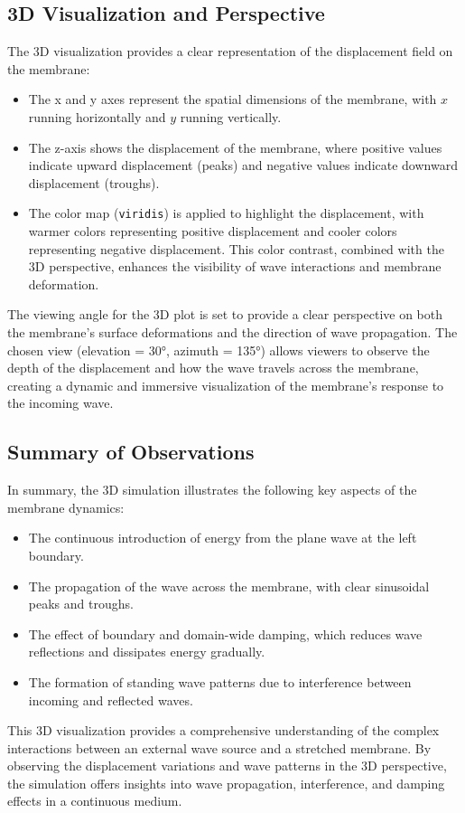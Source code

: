 \documentclass{article}
\begin{document}
\subsection{3D Visualization and Perspective}
The 3D visualization provides a clear representation of the displacement field on the membrane:
\begin{itemize}
    \item The x and y axes represent the spatial dimensions of the membrane, with $x$ running horizontally and $y$ running vertically.
    \item The z-axis shows the displacement of the membrane, where positive values indicate upward displacement (peaks) and negative values indicate downward displacement (troughs).
    \item The color map (\texttt{viridis}) is applied to highlight the displacement, with warmer colors representing positive displacement and cooler colors representing negative displacement. This color contrast, combined with the 3D perspective, enhances the visibility of wave interactions and membrane deformation.
\end{itemize}

The viewing angle for the 3D plot is set to provide a clear perspective on both the membrane's surface deformations and the direction of wave propagation. The chosen view (elevation = 30°, azimuth = 135°) allows viewers to observe the depth of the displacement and how the wave travels across the membrane, creating a dynamic and immersive visualization of the membrane’s response to the incoming wave.

\subsection{Summary of Observations}
In summary, the 3D simulation illustrates the following key aspects of the membrane dynamics:
\begin{itemize}
    \item The continuous introduction of energy from the plane wave at the left boundary.
    \item The propagation of the wave across the membrane, with clear sinusoidal peaks and troughs.
    \item The effect of boundary and domain-wide damping, which reduces wave reflections and dissipates energy gradually.
    \item The formation of standing wave patterns due to interference between incoming and reflected waves.
\end{itemize}

This 3D visualization provides a comprehensive understanding of the complex interactions between an external wave source and a stretched membrane. By observing the displacement variations and wave patterns in the 3D perspective, the simulation offers insights into wave propagation, interference, and damping effects in a continuous medium.
\end{document}
